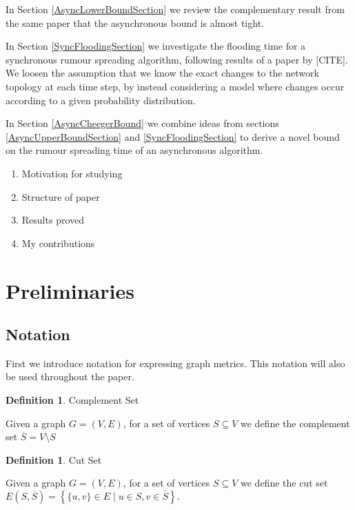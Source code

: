 \documentclass[a4paper,11pt]{article}
\theoremstyle{definition}
\newtheorem{definition}[theorem]{Definition}
\newcommand*\comp[1]{\overline{#1}}
\begin{document}
In Section \ref{AsyncLowerBoundSection} we review the complementary result from the same paper that the asynchronous bound is almost tight.

In Section \ref{SyncFloodingSection} we investigate the flooding time for a synchronous rumour spreading algorithm, following results of a paper by [CITE]. We loosen the assumption that we know the exact changes to the network topology at each time step, by instead considering a model where changes occur according to a given probability distribution.

In Section \ref{AsyncCheegerBound} we combine ideas from sections \ref{AsyncUpperBoundSection} and \ref{SyncFloodingSection} to derive a novel bound on the rumour spreading time of an asynchronous algorithm. 


\begin{enumerate}
	\item Motivation for studying
	\item Structure of paper
	\item Results proved
	\item My contributions
\end{enumerate}

\section{Preliminaries}
\label{Prelims}

\subsection{Notation}

First we introduce notation for expressing graph metrics. This notation will also be used throughout the paper. %

\begin{definition}
	Complement Set

	\noindent
	Given a graph $G = (V, E)$, for a set of vertices $S \subseteq V$ we define the complement set $\comp{S} = V \setminus S$
\end{definition}

\begin{definition}
	Cut Set

	\noindent
	Given a graph $G = (V, E)$, for a set of vertices $S \subseteq V$ we define the cut set $ E(S, \comp{S}) = \left\{\{u, v\} \in E \mid u \in S, v \in \comp{S} \right\}.$
\end{definition}
\end{document}
